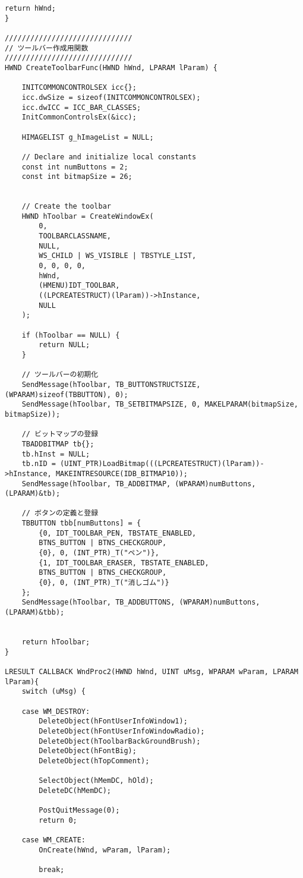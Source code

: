 \begin{lstlisting}[caption=UserInfoWindow.cpp]
	return hWnd;
}

//////////////////////////////
// ツールバー作成用関数
//////////////////////////////
HWND CreateToolbarFunc(HWND hWnd, LPARAM lParam) {

	INITCOMMONCONTROLSEX icc{};
	icc.dwSize = sizeof(INITCOMMONCONTROLSEX);
	icc.dwICC = ICC_BAR_CLASSES;
	InitCommonControlsEx(&icc);
	
	HIMAGELIST g_hImageList = NULL;

	// Declare and initialize local constants
	const int numButtons = 2;
	const int bitmapSize = 26;


	// Create the toolbar
	HWND hToolbar = CreateWindowEx(
		0,
		TOOLBARCLASSNAME,
		NULL,
		WS_CHILD | WS_VISIBLE | TBSTYLE_LIST,
		0, 0, 0, 0,
		hWnd,
		(HMENU)IDT_TOOLBAR,
		((LPCREATESTRUCT)(lParam))->hInstance,
		NULL
	);

	if (hToolbar == NULL) {
		return NULL;
	}

	// ツールバーの初期化
	SendMessage(hToolbar, TB_BUTTONSTRUCTSIZE, (WPARAM)sizeof(TBBUTTON), 0);
	SendMessage(hToolbar, TB_SETBITMAPSIZE, 0, MAKELPARAM(bitmapSize, bitmapSize));

	// ビットマップの登録
	TBADDBITMAP tb{};
	tb.hInst = NULL;
	tb.nID = (UINT_PTR)LoadBitmap(((LPCREATESTRUCT)(lParam))->hInstance, MAKEINTRESOURCE(IDB_BITMAP10));
	SendMessage(hToolbar, TB_ADDBITMAP, (WPARAM)numButtons, (LPARAM)&tb);

	// ボタンの定義と登録
	TBBUTTON tbb[numButtons] = {
		{0, IDT_TOOLBAR_PEN, TBSTATE_ENABLED,
		BTNS_BUTTON | BTNS_CHECKGROUP, 
		{0}, 0, (INT_PTR)_T("ペン")},
		{1, IDT_TOOLBAR_ERASER, TBSTATE_ENABLED,
		BTNS_BUTTON | BTNS_CHECKGROUP, 
		{0}, 0, (INT_PTR)_T("消しゴム")}
	};
	SendMessage(hToolbar, TB_ADDBUTTONS, (WPARAM)numButtons, (LPARAM)&tbb);


	return hToolbar;
}

LRESULT CALLBACK WndProc2(HWND hWnd, UINT uMsg, WPARAM wParam, LPARAM lParam){
	switch (uMsg) {
		
	case WM_DESTROY:
		DeleteObject(hFontUserInfoWindow1);
		DeleteObject(hFontUserInfoWindowRadio);
		DeleteObject(hToolbarBackGroundBrush);
		DeleteObject(hFontBig);
		DeleteObject(hTopComment);

		SelectObject(hMemDC, hOld);
		DeleteDC(hMemDC);

		PostQuitMessage(0);
		return 0;

	case WM_CREATE:
		OnCreate(hWnd, wParam, lParam);

		break;
	

\end{lstlisting}
